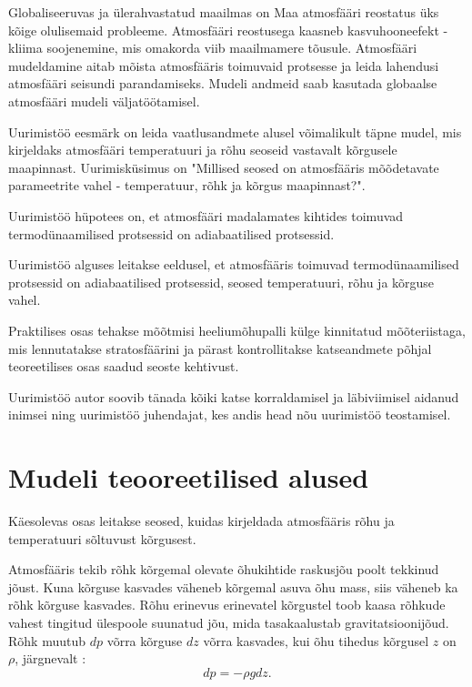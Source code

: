 \documentclass{trkut}%
\begin{document}
\maketitle%
\tableofcontents%

\nummerdame
Globaliseeruvas ja ülerahvastatud maailmas on Maa atmosfääri reostatus üks kõige olulisemaid probleeme. Atmosfääri reostusega kaasneb kasvuhooneefekt - kliima soojenemine, mis omakorda viib maailmamere tõusule. Atmosfääri mudeldamine aitab mõista atmosfääris toimuvaid protsesse ja leida lahendusi atmosfääri seisundi parandamiseks. Mudeli andmeid saab kasutada globaalse atmosfääri mudeli väljatöötamisel.

Uurimistöö eesmärk on leida vaatlusandmete alusel võimalikult täpne mudel, mis kirjeldaks atmosfääri temperatuuri ja rõhu seoseid vastavalt kõrgusele maapinnast. Uurimisküsimus on "Millised seosed on atmosfääris mõõdetavate parameetrite vahel - temperatuur, rõhk ja kõrgus maapinnast?".

Uurimistöö hüpotees on, et atmosfääri madalamates kihtides toimuvad termodünaamilised protsessid on adiabaatilised protsessid.

Uurimistöö alguses leitakse eeldusel, et atmosfääris toimuvad termodünaamilised protsessid on adiabaatilised protsessid, seosed temperatuuri, rõhu ja kõrguse vahel.

Praktilises osas tehakse mõõtmisi heeliumõhupalli külge kinnitatud mõõteriistaga, mis lennutatakse stratosfäärini ja pärast kontrollitakse katseandmete põhjal teoreetilises osas saadud seoste kehtivust.

Uurimistöö autor soovib tänada kõiki katse korraldamisel ja läbiviimisel aidanud inimsei ning uurimistöö juhendajat, kes andis head nõu uurimistöö teostamisel.





\chapter{Mudeli teooreetilised alused}
Käesolevas osas leitakse seosed, kuidas kirjeldada atmosfääris rõhu ja temperatuuri sõltuvust kõrgusest.

Atmosfääris tekib rõhk kõrgemal olevate õhukihtide raskusjõu poolt tekkinud jõust. Kuna kõrguse kasvades väheneb kõrgemal asuva õhu mass, siis väheneb ka rõhk kõrguse kasvades. Rõhu erinevus erinevatel kõrgustel toob kaasa rõhkude vahest tingitud ülespoole suunatud jõu, mida tasakaalustab gravitatsioonijõud. Rõhk muutub $dp$ võrra kõrguse $dz$ võrra kasvades, kui õhu tihedus kõrgusel $z$ on $\rho$, järgnevalt \parencite[67--68]{raamat1}:
\begin{equation}\label{eq10}
dp=-\rho gdz.   
\end{equation}
\end{document}
